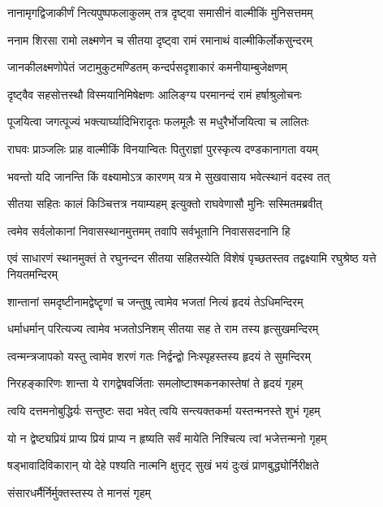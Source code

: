 \twolineshloka
{नानामृगद्विजाकीर्णं नित्यपुष्पफलाकुलम्}
{तत्र दृष्ट्वा समासीनं वाल्मीकिं मुनिसत्तमम्} %

\twolineshloka
{ननाम शिरसा रामो लक्ष्मणेन च सीतया}
{दृष्ट्वा रामं रमानाथं वाल्मीकिर्लोकसुन्दरम्} %

\twolineshloka
{जानकीलक्ष्मणोपेतं जटामुकुटमण्डितम्}
{कन्दर्पसदृशाकारं कमनीयाम्बुजेक्षणम्} %

\twolineshloka
{दृष्ट्वैव सहसोत्तस्थौ विस्मयानिमिषेक्षणः}
{आलिङ्ग्य परमानन्दं रामं हर्षाश्रुलोचनः} %

\twolineshloka
{पूजयित्वा जगत्पूज्यं भक्त्यार्घ्यादिभिरादृतः}
{फलमूलैः स मधुरैर्भोजयित्वा च लालितः} %

\twolineshloka
{राघवः प्राञ्जलिः प्राह वाल्मीकिं विनयान्वितः}
{पितुराज्ञां पुरस्कृत्य दण्डकानागता वयम्} %

\twolineshloka
{भवन्तो यदि जानन्ति किं वक्ष्यामोऽत्र कारणम्}
{यत्र मे सुखवासाय भवेत्स्थानं वदस्व तत्} %

\twolineshloka
{सीतया सहितः कालं किञ्चित्तत्र नयाम्यहम्}
{इत्युक्तो राघवेणासौ मुनिः सस्मितमब्रवीत्} %

\twolineshloka
{त्वमेव सर्वलोकानां निवासस्थानमुत्तमम्}
{तवापि सर्वभूतानि निवाससदनानि हि} %

\threelineshloka
{एवं साधारणं स्थानमुक्तं ते रघुनन्दन}
{सीतया सहितस्येति विशेषं पृच्छतस्तव}
{तद्वक्ष्यामि रघुश्रेष्ठ यत्ते नियतमन्दिरम्} %

\twolineshloka
{शान्तानां समदृष्टीनामद्वेष्टॄणां च जन्तुषु}
{त्वामेव भजतां नित्यं हृदयं तेऽधिमन्दिरम्} %

\twolineshloka
{धर्माधर्मान् परित्यज्य त्वामेव भजतोऽनिशम्}
{सीतया सह ते राम तस्य हृत्सुखमन्दिरम्} %

\twolineshloka
{त्वन्मन्त्रजापको यस्तु त्वामेव शरणं गतः}
{निर्द्वन्द्वो निःस्पृहस्तस्य हृदयं ते सुमन्दिरम्} %

\twolineshloka
{निरहङ्कारिणः शान्ता ये रागद्वेषवर्जिताः}
{समलोष्टाश्मकनकास्तेषां ते हृदयं गृहम्} %

\twolineshloka
{त्वयि दत्तमनोबुद्धिर्यः सन्तुष्टः सदा भवेत्}
{त्वयि सन्त्यक्तकर्मा यस्तन्मनस्ते शुभं गृहम्} %

\twolineshloka
{यो न द्वेष्ट्यप्रियं प्राप्य प्रियं प्राप्य न हृष्यति}
{सर्वं मायेति निश्चित्य त्वां भजेत्तन्मनो गृहम्} %

\twolineshloka
{षड्भावादिविकारान् यो देहे पश्यति नात्मनि}
{क्षुत्तृट् सुखं भयं दुःखं प्राणबुद्ध्योर्निरीक्षते} %

\onelineshloka
{संसारधर्मैर्निर्मुक्तस्तस्य ते मानसं गृहम्} %

